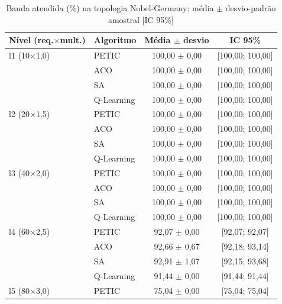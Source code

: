 \begin{table}[htb]
    \centering
    \small
    \caption{Banda atendida (\%) na topologia Nobel-Germany: média $\pm$ desvio-padrão amostral [IC 95\%]}
    \label{tab:banda-nobel-germany}
    \begin{tabular}{llcc}
        \hline
        Nível (req.$\times$mult.) & Algoritmo & Média $\pm$ desvio & IC 95\% \\
        \hline
        l1 (10$\times$1,0) & PETIC & 100,00 $\pm$ 0,00 & [100,00; 100,00] \\
         & ACO & 100,00 $\pm$ 0,00 & [100,00; 100,00] \\
         & SA & 100,00 $\pm$ 0,00 & [100,00; 100,00] \\
         & Q-Learning & 100,00 $\pm$ 0,00 & [100,00; 100,00] \\
        \hline
        l2 (20$\times$1,5) & PETIC & 100,00 $\pm$ 0,00 & [100,00; 100,00] \\
         & ACO & 100,00 $\pm$ 0,00 & [100,00; 100,00] \\
         & SA & 100,00 $\pm$ 0,00 & [100,00; 100,00] \\
         & Q-Learning & 100,00 $\pm$ 0,00 & [100,00; 100,00] \\
        \hline
        l3 (40$\times$2,0) & PETIC & 100,00 $\pm$ 0,00 & [100,00; 100,00] \\
         & ACO & 100,00 $\pm$ 0,00 & [100,00; 100,00] \\
         & SA & 100,00 $\pm$ 0,00 & [100,00; 100,00] \\
         & Q-Learning & 100,00 $\pm$ 0,00 & [100,00; 100,00] \\
        \hline
        l4 (60$\times$2,5) & PETIC & 92,07 $\pm$ 0,00 & [92,07; 92,07] \\
         & ACO & 92,66 $\pm$ 0,67 & [92,18; 93,14] \\
         & SA & 92,91 $\pm$ 1,07 & [92,15; 93,68] \\
         & Q-Learning & 91,44 $\pm$ 0,00 & [91,44; 91,44] \\
        \hline
        l5 (80$\times$3,0) & PETIC & 75,04 $\pm$ 0,00 & [75,04; 75,04] \\

\end{tabular}
\end{table}
